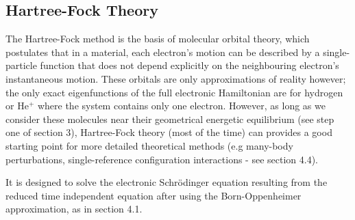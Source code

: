 \documentclass[10pt]{article}
\begin{document}
\subsection{Hartree-Fock Theory}
The Hartree-Fock method is the basis of molecular orbital theory, which postulates that in a material, each electron's motion can be described by a single-particle function that does not depend explicitly on the neighbouring electron's instantaneous motion. These orbitals are only approximations of reality however; the only exact eigenfunctions of the full electronic Hamiltonian are for hydrogen or He$^+$ where the system contains only one electron. However, as long as we consider these molecules near their geometrical energetic equilibrium (see step one of section 3), Hartree-Fock theory (most of the time) can provides a good starting point for more detailed theoretical methods (e.g many-body perturbations, single-reference configuration interactions - see section 4.4). 

It is designed to solve the electronic Schrödinger equation resulting from the reduced time independent equation after using the Born-Oppenheimer approximation, as in section 4.1. %



\end{document}
